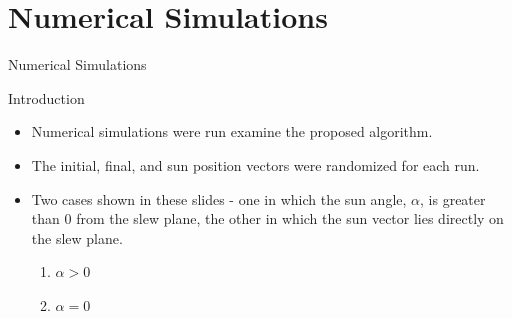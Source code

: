 \documentclass{beamer}
\begin{document}
\section{Numerical Simulations}
\begin{frame}{Numerical Simulations} 
	\begin{block}{Introduction}
		\begin{itemize}
			\item Numerical simulations were run examine the proposed algorithm. 
			\item The initial, final, and sun position vectors were randomized for each run. 
			\item Two cases shown in these slides - one in which the sun angle, $\alpha$, is greater than 0 from the slew plane, the other in which the sun vector lies directly on the slew plane. 
			\begin{enumerate}
				\item $\alpha > 0$ 
				\item $\alpha = 0$
			\end{enumerate}
		\end{itemize}
	\end{block}
\end{frame}
\end{document}
